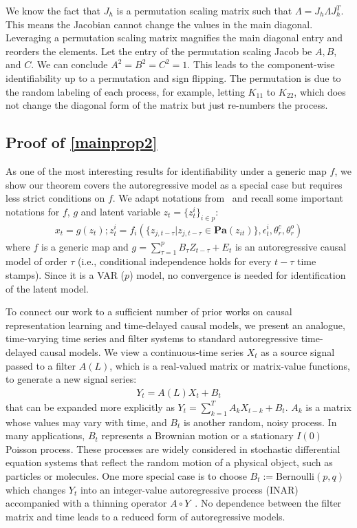 \documentclass[10pt]{article}
\numberwithin{figure}{section}
\begin{document}
We know the fact that $J_h$ is a permutation scaling matrix such that $\Lambda=J_h\Lambda J_h^T$. This means the Jacobian cannot change the values in the main diagonal. Leveraging a permutation scaling matrix magnifies the main diagonal entry and reorders the elements. Let the entry of the permutation scaling Jacob be $A,B$, and $C$. We can conclude $A^2=B^2=C^2=1$. This leads to the component-wise identifiability up to a permutation and sign flipping. The permutation is due to the random labeling of each process, for example, letting $K_{11}$ to $K_{22}$, which does not change the diagonal form of the matrix but just re-numbers the process.


\subsection{Proof of \autoref{mainprop2}}

As one of the most interesting results for identifiability under a generic map $f$, we show our theorem covers the autoregressive model as a special case but requires less strict conditions on $f$. We adapt notations from~\citep{yao_temporally_2022} and recall some important notations for $f$, $g$ and latent variable $z_t=\{z_t^i\}_{i\in p}$:
\begin{align}
    x_t = g(z_t); z_{t}^i= f_i(\{z_{j,t-\tau}|z_{j,t-\tau} \in \textbf{Pa}(z_{it})\},\epsilon_{t}^i,\theta_r^c,\theta_r^o)
\end{align}
where $f$ is a generic map and $g= \sum\limits_{\tau=1}^{p}B_{\tau}Z_{t-\tau}+ E_t$ is an autoregressive causal model of order $\tau$ (i.e., conditional independence holds for every $t-\tau$ time stamps). Since it is a VAR ($p$) model, no convergence is needed for identification of the latent model. 

To connect our work to a sufficient number of prior works on causal representation learning and time-delayed causal models, we present an analogue, time-varying time series and filter systems to standard autoregressive time-delayed causal models.  We view a continuous-time series $X_t$ as a source signal passed to a filter $A(L)$, which is a real-valued matrix or matrix-value functions, to generate a new signal series:
\begin{align}\label{eq1}
    Y_t = A(L)X_t + B_t
\end{align}
that can be expanded more explicitly as $Y_t = \sum\limits_{k=1}^{T}A_kX_{t-k}+ B_t$. 
$A_k$ is a matrix whose values may vary with time, and $B_t$ is another random, noisy process. In many applications, $B_t$ represents a Brownian motion or a stationary $I(0)$ Poisson process.  These processes are widely considered in stochastic differential equation systems that reflect the random motion of a physical object, such as particles or molecules. One more special case is to choose $B_t:= \mathrm{Bernoulli}(p,q)$ which changes $Y_t$ into an integer-value autoregressive process ($\mathrm{INAR}$) accompanied with a thinning operator $A\circ Y$~\citep{weis_thinning_2008}.  No dependence between the filter matrix and time leads to a reduced form of autoregressive models. 
\end{document}
